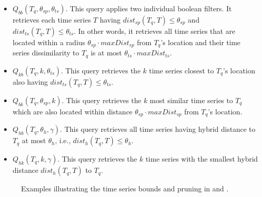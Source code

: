 \begin{itemize}
 \item $Q_{bb}(T_q, \theta_{sp}, \theta_{ts})$. This query applies two individual boolean filters. It retrieves each time series $T$ having $dist_{sp}(T_q, T) \leq \theta_{sp}$ and $dist_{ts}(T_q, T) \leq \theta_{ts}$. In other words, it retrieves all time series that are located within a radius $\theta_{sp} \cdot maxDist_{sp}$ from $T_q$'s location and their time series dissimilarity to $T_q$ is at most $\theta_{ts} \cdot maxDist_{ts}$.
 \item $Q_{kb}(T_q, k, \theta_{ts})$. This query retrieves the $k$ time series closest to $T_q$'s location also having $dist_{ts}(T_q, T) \leq \theta_{ts}$.
 \item $Q_{bk}(T_q, \theta_{sp}, k)$. This query retrieves the $k$ most similar time series to $T_q$ which are also located within distance $\theta_{sp} \cdot maxDist_{sp}$ from $T_q$'s location.
 \item $Q_{hb}(T_q, \theta_h, \gamma)$. This query retrieves all time series having hybrid distance to $T_q$ at most $\theta_h$, i.e., $dist_h(T_q, T) \leq \theta_h$.
 \item $Q_{hk}(T_q, k, \gamma)$. This query retrieves the $k$ time series with the smallest hybrid distance $dist_h(T_q, T)$ to $T_q$.
\end{itemize}




\begin{figure}[!t]
 \centering
 \hspace{8pt}
 \hspace{8pt}
\caption{Examples illustrating the time series bounds and pruning in \tsr and \ctsr.}
\label{fig:example_bounds}
\end{figure}


